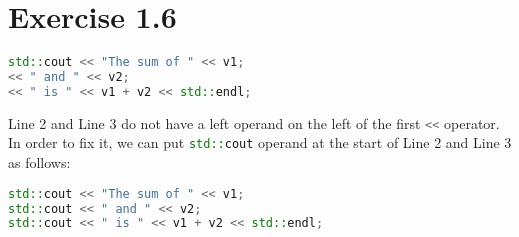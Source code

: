 \documentclass{article}
\begin{document}
\section*{Exercise 1.6}

\begin{lstlisting}[language=C++]
std::cout << "The sum of " << v1;
<< " and " << v2;
<< " is " << v1 + v2 << std::endl;
\end{lstlisting}

\begin{flushleft}
Line 2 and Line 3 do not have a left operand on the left of the first \lstinline[language=C++]{<<} operator. In order to fix it,
we can put \lstinline[language=C++]{std::cout} operand at the start of Line 2 and Line 3 as follows:
\end{flushleft}

\begin{lstlisting}[language=C++]
std::cout << "The sum of " << v1;
std::cout << " and " << v2;
std::cout << " is " << v1 + v2 << std::endl;
\end{lstlisting}
\end{document}
